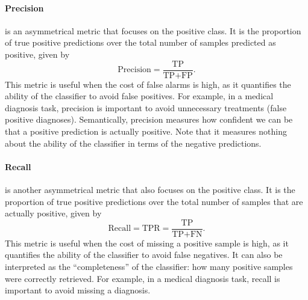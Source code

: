 \paragraph{Precision} is an asymmetrical metric that focuses on the positive class.  It is
the proportion of true positive predictions over the total number of samples predicted as
positive, given by
\begin{equation*}
  \text{Precision} = \frac{\text{TP}}{\text{TP} + \text{FP}}\text{.}
\end{equation*}
This metric is useful when the cost of false alarms is high, as it quantifies the
ability of the \gls{classifier} to avoid false positives.  For example, in a medical diagnosis
task, precision is important to avoid unnecessary treatments (false positive diagnoses).
Semantically, precision measures how confident we can be that a positive prediction is
actually positive.  Note that it measures nothing about the ability of the \gls{classifier} in
terms of the negative predictions.

\paragraph{Recall} is another asymmetrical metric that also focuses on the positive class.
It is the proportion of true positive predictions over the total number of
samples that are actually positive, given by
\begin{equation*}
  \text{Recall} = \text{TPR} = \frac{\text{TP}}{\text{TP} + \text{FN}}\text{.}
\end{equation*}
This metric is useful when the cost of missing a positive sample is high, as it quantifies the
ability of the \gls{classifier} to avoid false negatives.  It can also be interpreted as the
``completeness'' of the \gls{classifier}: how many positive samples were correctly retrieved.
For example, in a medical diagnosis task, recall is important to avoid missing a
diagnosis.

